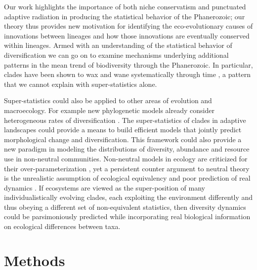 \documentclass[12pt]{article}
\let\citep=\autocite
\begin{document}
Our work highlights the importance of both niche conservatism and
punctuated adaptive radiation in producing the statistical behavior of
the Phanerozoic; our theory thus provides new motivation for
identifying the eco-evolutionary causes of innovations between
lineages and how those innovations are eventually conserved within
lineages. Armed with an understanding of the statistical behavior of
diversification we can go on to examine mechanisms underlying
additional patterns in the mean trend of biodiversity through the
Phanerozoic. In particular, clades have been shown to wax and wane
systematically through time \citep{liow2007,
  quental2013}, a pattern that we cannot explain with super-statistics
alone.


Super-statistics could also be applied to other areas of evolution and
macroecology.  For example new phylogenetic models already consider
heterogeneous rates of diversification
\citep[e.g.][]{rabosky2006laser}. The super-statistics of clades in
adaptive landscapes could provide a means to build efficient models
that jointly predict morphological change and diversification. This
framework could also provide a new paradigm in modeling the
distributions of diversity, abundance and resource use in non-neutral
communities. Non-neutral models in ecology are criticized for their
over-parameterization \citep{rosindell2011TREE}, yet a persistent
counter argument to neutral theory \citep{hubbell2001} is the
unrealistic assumption of ecological equivalency
\citep{chave2004neutral} and poor prediction of real dynamics
\citep{ricklefs2006neutral}. If ecosystems are viewed as the
super-position of many individualistically evolving clades, each
exploiting the environment differently and thus obeying a different
set of non-equivalent statistics, then diversity dynamics could be
parsimoniously predicted while incorporating real biological
information on ecological differences between taxa.

\section{Methods}
\end{document}
